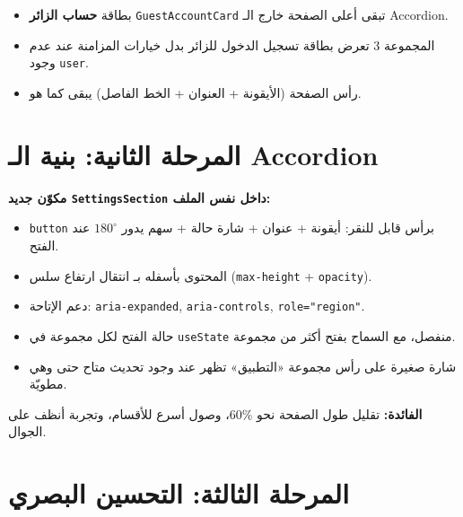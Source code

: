 \documentclass[11pt]{article}
\begin{document}
\begin{itemize}
  \item بطاقة \textbf{حساب الزائر} \texttt{GuestAccountCard} تبقى أعلى الصفحة خارج الـ Accordion.
  \item المجموعة 3 تعرض بطاقة تسجيل الدخول للزائر بدل خيارات المزامنة عند عدم وجود \texttt{user}.
  \item رأس الصفحة (الأيقونة + العنوان + الخط الفاصل) يبقى كما هو.
\end{itemize}

\section{المرحلة الثانية: بنية الـ Accordion}

\textbf{مكوّن جديد \texttt{SettingsSection} داخل نفس الملف:}
\begin{itemize}
  \item \texttt{button} برأس قابل للنقر: أيقونة + عنوان + شارة حالة + سهم يدور $180^\circ$ عند الفتح.
  \item المحتوى بأسفله بـ انتقال ارتفاع سلس (\texttt{max-height} + \texttt{opacity}).
  \item دعم الإتاحة: \texttt{aria-expanded}, \texttt{aria-controls}, \texttt{role="region"}.
  \item حالة الفتح لكل مجموعة في \texttt{useState} منفصل، مع السماح بفتح أكثر من مجموعة.
  \item شارة صغيرة على رأس مجموعة «التطبيق» تظهر عند وجود تحديث متاح حتى وهي مطويّة.
\end{itemize}

\begin{goalbox}
\textbf{الفائدة:} تقليل طول الصفحة نحو $60\%$، وصول أسرع للأقسام، وتجربة أنظف على الجوال.
\end{goalbox}

\section{المرحلة الثالثة: التحسين البصري}
\end{document}
